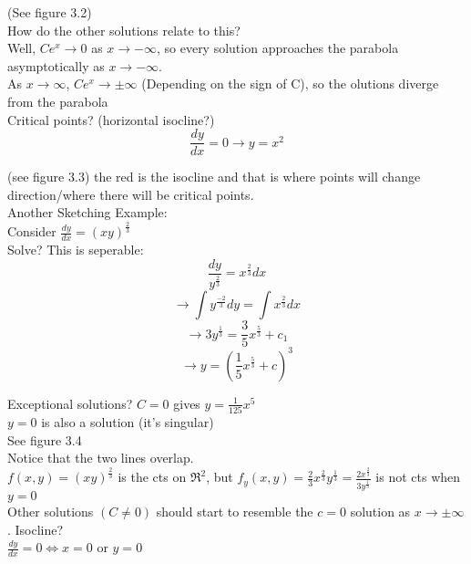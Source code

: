 \documentclass[12pt]{article}
\begin{document}
	(See figure 3.2)\\
	
	How do the other solutions relate to this?\\
	Well, $Ce^x \rightarrow 0$ as $x \rightarrow -\infty$, so every solution approaches the parabola asymptotically as $x \rightarrow -\infty$.\\
	As $x \rightarrow \infty$, $Ce^x \rightarrow \pm \infty$ (Depending on the sign of C), so the olutions diverge from the parabola\\
	
	Critical points? (horizontal isocline?)\\
	$$\frac{dy}{dx} = 0 \rightarrow y = x^2$$
	
	(see figure 3.3) the red is the isocline and that is where points will change direction/where there will be critical points.\\
	
	Another Sketching Example:\\
	Consider $\frac{dy}{dx} = (xy)^{\frac{2}{3}}$\\
	Solve? This is seperable:\\
	$$\frac{dy}{y^{\frac{2}{3}}} = x^{\frac{2}{3}}dx$$
	$$\rightarrow \int y^{\frac{-2}{3}}dy = \int x^{\frac{2}{3}}dx$$
	$$\rightarrow 3y^{\frac{1}{3}} = \frac{3}{5}x^{\frac{5}{3}} + c_1$$
	$$\rightarrow y = (\frac{1}{5}x^{\frac{5}{3}} + c)^3$$
		
	Exceptional solutions? $C = 0$ gives $y = \frac{1}{125}x^5$\\
	$y = 0$ is also a solution (it's singular)\\
	See figure 3.4\\
	Notice that the two lines overlap.\\
	$f(x,y) = (xy)^{\frac{2}{3}}$ is the cts on $\Re^2$, but $f_y(x,y) = \frac{2}{3}x^{\frac{2}{3}}y^{\frac{1}{3}} = \frac{2x^{\frac{2}{3}}}{3y^{\frac{1}{3}}}$ is not cts when $y = 0$\\
	
	Other solutions $(C \ne 0)$ should start to resemble the $c = 0$ solution as $x \rightarrow \pm \infty$. Isocline?\\
	$\frac{dy}{dx} = 0 \iff x = 0$ or $y = 0$\\
	
	
	
	
\end{document}
